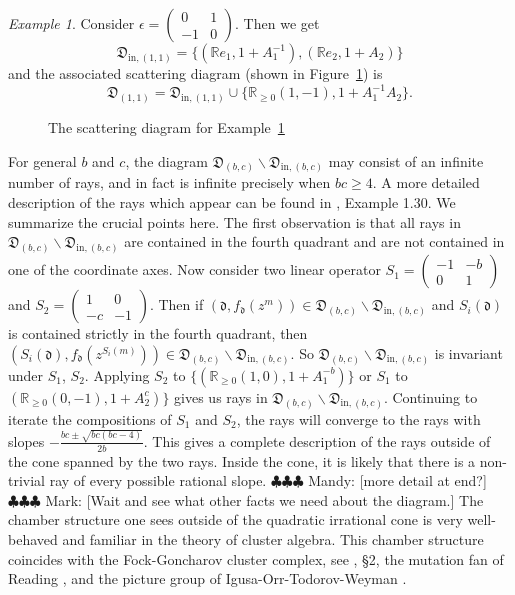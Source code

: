 \documentclass[12pt]{amsart}
\newcommand\mandy[1]{{\color{blue} \sf $\clubsuit\clubsuit\clubsuit$ Mandy: [#1]}}
\newcommand\markg[1]{{\color{red} \sf $\clubsuit\clubsuit\clubsuit$ Mark: [#1]}}
\theoremstyle{remark}
\newtheorem{example}[theorem]{Example}
\newcommand{\RR}{\mathbb{R}}
\newcommand{\dd}{\mathfrak{d}}
\newcommand{\DD}{\mathfrak{D}}
\begin{document}
\begin{example} \label{ex}
Consider $\epsilon =  \begin{pmatrix}
0 &1 \\
-1 &0
\end{pmatrix}$. 
Then we get
\[\DD_{\mathrm{in},(1,1)} =  \{ (\RR e_1, 1+A_1^{-1}), (\RR e_2, 1+A_2)  \}   \]
and the associated scattering diagram (shown in Figure~\ref{fig:diagex}) is
\[ \DD_{(1,1)} = \DD_{\mathrm{in},(1,1)} \cup \{\RR_{\geq 0} (1,-1), 1+A_1^{-1}A_2  \}.   \]

\begin{figure}
\centering
{}
\caption{The scattering diagram for Example~\ref{ex}} \label{fig:diagex}
\end{figure}
\end{example}

For general $b$ and $c$, the diagram $\DD_{(b,c)} \backslash 
\DD_{\mathrm{in},(b,c)}$ may 
consist of an infinite number of rays, and in fact is infinite precisely
when $bc\ge 4$. A more detailed description of the rays which appear
can be found in \cite{GHKK}, Example 1.30. We summarize the crucial
points here.
The first observation is that all rays in $\DD_{(b,c)} \backslash 
\DD_{\mathrm{in},(b,c)}$
are contained in the fourth quadrant and are not contained in one of the
coordinate axes. Now consider two linear operator
$S_1 =  
\begin{pmatrix}
-1 & -b \\
0& 1
\end{pmatrix}
$
and
$S_2 =  
\begin{pmatrix}
1 & 0 \\
-c & -1
\end{pmatrix}
$.
Then if $(\dd, f_{\dd}(z^m)) \in \DD_{(b,c)} \backslash \DD_{\mathrm{in},(b,c)}$
and $S_i (\dd)$ is contained strictly in the fourth quadrant, then 
$(S_i(\dd), f_{\dd}(z^{S_i(m)})) \in \DD_{(b,c)} \backslash 
\DD_{\mathrm{in},(b,c)}$. 
So $\DD_{(b,c)} \backslash \DD_{\mathrm{in},(b,c)}$ is invariant under $S_1$, $S_2$. 
Applying $S_2$ to $\{ (\RR_{\geq 0}(1,0), 1+A_1^{-b}) \}$ or $S_1$ to 
$(\RR_{\geq 0}(0,-1), 1+A_2^c)  \}$ gives us rays in $\DD_{(b,c)} \backslash 
\DD_{\mathrm{in},(b,c)}$. Continuing to iterate the compositions of $S_1$ and $S_2$, 
the rays will converge to the rays with slopes $-\frac{bc \pm \sqrt{bc(bc-4)}}{2b}$. This gives a complete description of the rays outside of the cone spanned by the two rays. Inside the cone, it is likely that there is a non-trivial
ray of every possible rational slope. 
\mandy{more detail at end?}\markg{Wait and see what other facts we need about
the diagram.} The chamber structure one sees outside of the quadratic 
irrational cone is very well-behaved and familiar in the theory of
cluster algebra. This chamber structure coincides with the Fock-Goncharov 
cluster complex, see \cite{GHKK}, \S2, the mutation fan of Reading \cite{R}, 
and the picture group of Igusa-Orr-Todorov-Weyman \cite{IOTW}.
\end{document}
